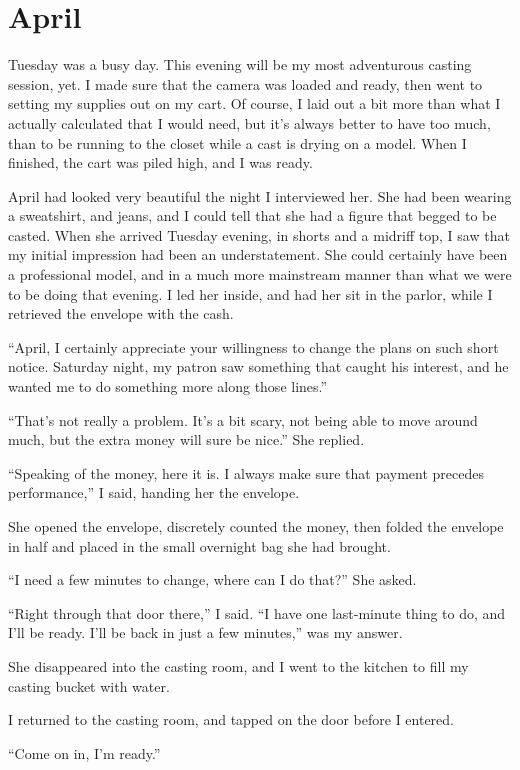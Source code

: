 \chapter{April}
    Tuesday was a busy day. This evening will be my most adventurous casting session, yet. I
made sure that the camera was loaded and ready, then went to setting my supplies out on my cart.
Of course, I laid out a bit more than what I actually calculated that I would need, but it's
always better to have too much, than to be running to the closet while a cast is drying on a
model. When I finished, the cart was piled high, and I was ready.

April had looked very beautiful the night I interviewed her. She had been wearing a sweatshirt,
and jeans, and I could tell that she had a figure that begged to be casted. When she arrived
Tuesday evening, in shorts and a midriff top, I saw that my initial impression had been an
understatement. She could certainly have been a professional model, and in a much more
mainstream manner than what we were to be doing that evening. I led her inside, and had her sit
in the parlor, while I retrieved the envelope with the cash.

``April, I certainly appreciate your willingness to change the plans on such short notice.
Saturday night, my patron saw something that caught his interest, and he wanted me to do
something more along those lines.''

``That's not really a problem. It's a bit scary, not being able to move around much, but the
extra money will sure be nice.'' She replied.

``Speaking of the money, here it is. I always make sure that payment precedes performance,'' I
said, handing her the envelope.

She opened the envelope, discretely counted the money, then folded the envelope in half and
placed in the small overnight bag she had brought.

``I need a few minutes to change, where can I do that?'' She asked.

``Right through that door there,'' I said. ``I have one last-minute thing to do, and I'll be
ready. I'll be back in just a few minutes,'' was my answer.

She disappeared into the casting room, and I went to the kitchen to fill my casting bucket with
water.

I returned to the casting room, and tapped on the door before I entered.

``Come on in, I'm ready.''


